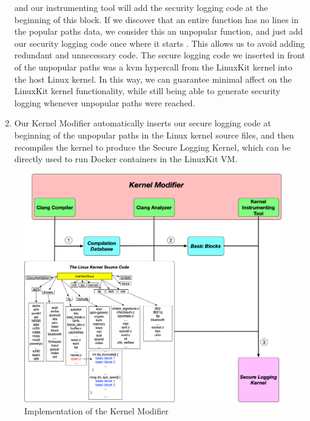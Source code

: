 \begin{enumerate}
	and our instrumenting tool will add the security logging code at the beginning of this block. If we discover that an entire function has no  lines in the popular paths data, we consider this an unpopular function, 
	and just add our security logging code once where it starts . This allows us to avoid adding redundant and unnecessary code. 
	The secure logging code we inserted in front of the unpopular paths was a kvm hypercall from the LinuxKit kernel into the host Linux kernel. 
	In this way, we can guarantee minimal affect on the LinuxKit kernel functionality, while still being able to generate security logging whenever unpopular paths were reached.
	\item Our Kernel Modifier automatically inserts our secure logging code at beginning of the unpopular paths in the Linux kernel source files, 
	and then recompiles the kernel to produce the Secure Logging Kernel, which can be directly used to run Docker containers in the LinuxKit VM. 
\end{enumerate}

\begin{figure}
\centering
\includegraphics[width=1.5\columnwidth]{diagram/linuxkit-kernel-modifier.png}
\caption{\small Implementation of the Kernel Modifier}
\label{fig:linuxkit-kernel-modifier}
\end{figure}
